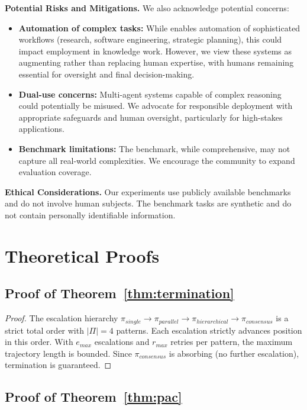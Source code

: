 \documentclass{article}
\theoremstyle{plain}
\theoremstyle{definition}
\theoremstyle{remark}
\begin{document}
\textbf{Potential Risks and Mitigations.} We also acknowledge potential concerns:
\begin{itemize}[nosep,leftmargin=*]
	\item \textbf{Automation of complex tasks:} While \amore{} enables automation of sophisticated workflows (research, software engineering, strategic planning), this could impact employment in knowledge work. However, we view these systems as augmenting rather than replacing human expertise, with humans remaining essential for oversight and final decision-making.
	\item \textbf{Dual-use concerns:} Multi-agent systems capable of complex reasoning could potentially be misused. We advocate for responsible deployment with appropriate safeguards and human oversight, particularly for high-stakes applications.
	\item \textbf{Benchmark limitations:} The \mars{} benchmark, while comprehensive, may not capture all real-world complexities. We encourage the community to expand evaluation coverage.
\end{itemize}

\textbf{Ethical Considerations.} Our experiments use publicly available benchmarks and do not involve human subjects. The \mars{} benchmark tasks are synthetic and do not contain personally identifiable information.

\section{Theoretical Proofs}
\label{sec:proofs}
\subsection{Proof of Theorem~\ref{thm:termination}}
	\begin{proof}
		\label{pr:Escalation Termination}
		The escalation hierarchy $\pi_{single} \to \pi_{parallel} \to
		\pi_{hierarchical} \to \pi_{consensus}$ is a strict total order
		with $|\Pi| = 4$ patterns. Each escalation strictly advances
		position in this order. With $e_{max}$ escalations and $r_{max}$
		retries per pattern, the maximum trajectory length is bounded.
		Since $\pi_{consensus}$ is absorbing (no further escalation),
		termination is guaranteed.		
	\end{proof}
	
\subsection{Proof of Theorem~\ref{thm:pac}}
\end{document}
